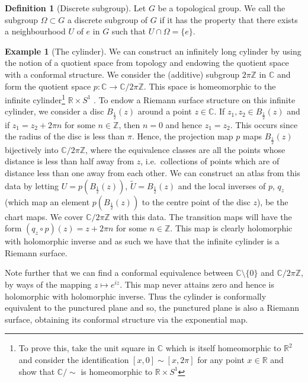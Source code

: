 \documentclass[11pt]{report}
\theoremstyle{definition}
\newtheorem{defn}[thm]{Definition}
\newtheorem*{example*}{Example}
\begin{document}
\begin{defn}[Discrete subgroup]
  Let $G$ be a topological group. We call the subgroup $\Omega \subset G$ a discrete subgroup of $G$ if it has the property that there exists a neighbourhood $U$ of $e$ in $G$ such that $U \cap \Omega = \{e\}$.
\end{defn}
\begin{example*}[The cylinder]
We can construct an infinitely long cylinder by using the notion of a quotient space from topology and endowing the quotient space with a conformal structure. We consider the (additive) subgroup $2\pi \mathbb{Z}$ in $\mathbb{C}$ and form the quotient space $p \colon \mathbb{C} \rightarrow \mathbb{C}/2\pi \mathbb{Z}$. This space is homeomorphic to the infinite cylinder\footnote{To prove this, take the unit square in $\mathbb{C}$ which is itself homeomorphic to $\mathbb{R}^2$ and consider the identification $[x,0] \sim [x,2\pi]$ for any point $x \in \mathbb{R}$ and show that $\mathbb{C}/\sim$ is homeomorphic to $\mathbb{R}\times S^1$} $\mathbb{R} \times S^1$ . To endow a Riemann surface structure on this infinite cylinder, we consider a disc $B_{\frac{1}{2}}(z)$ around a point $z \in \mathbb{C}$. If $z_1, z_2 \in B_{\frac{1}{2}}(z)$ and if $z_1 = z_2 + 2\pi n$ for some $n \in \mathbb{Z}$, then $n=0$ and hence $z_1=z_2$. This occurs since the radius of the disc is less than $\pi$. Hence, the projection map $p$ maps $B_{\frac{1}{2}}(z)$ bijectively into $\mathbb{C}/2\pi\mathbb{Z}$, where the equivalence classes are all the points whose distance is less than half away from $z$, i.e.\ collections of points which are of distance less than one away from each other. We can construct an atlas from this data by letting $U = p(B_{\frac{1}{2}}(z))$, $\widetilde{U} = B_{\frac{1}{2}}(z)$ and the local inverses of $p$, $q_z$ (which map an element $p(B_{\frac{1}{2}}(z))$ to the centre point of the disc $z$), be the chart maps. We cover $\mathbb{C}/2\pi\mathbb{Z}$ with this data. The transition maps will have the form $(q_z \circ p)(z) = z + 2\pi n$ for some $n \in \mathbb{Z}$. This map is clearly holomorphic with holomorphic inverse and as such we have that the infinite cylinder is a Riemann surface. 

Note further that we can find a conformal equivalence between $\mathbb{C}\setminus \{0\}$ and $\mathbb{C}/2\pi\mathbb{Z}$, by ways of the mapping $z \mapsto e^{iz}$. This map never attains zero and hence is holomorphic with holomorphic inverse. Thus the cylinder is conformally equivalent to the punctured plane and so, the punctured plane is also a Riemann surface, obtaining its conformal structure via the exponential map. 
\end{example*}
 
\end{document}
